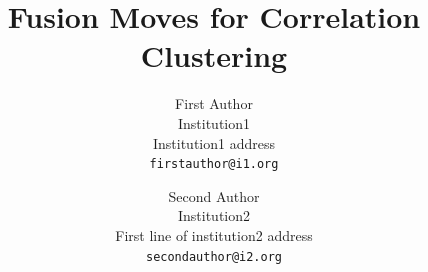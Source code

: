 \documentclass[10pt,twocolumn,letterpaper]{article}
\theoremstyle{definition}
\begin{document}

\title{Fusion Moves for Correlation Clustering}

\author{First Author\\
Institution1\\
Institution1 address\\
{\tt\small firstauthor@i1.org}
\and
Second Author\\
Institution2\\
First line of institution2 address\\
{\tt\small secondauthor@i2.org}
}

\maketitle


\begin{abstract}

%    
%
\end{abstract}
\vspace{-0.6cm}
\end{document}
